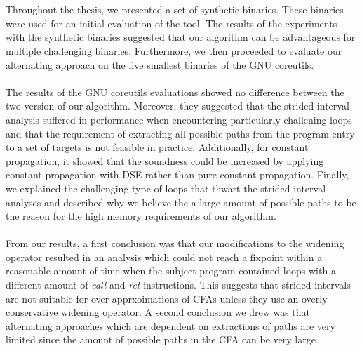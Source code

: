 \documentclass{kththesis}
\renewcommand{\it}[1]{\textit{#1}}
\begin{document}
\\ \\
Throughout the thesis, we presented a set of synthetic binaries. These binaries were used for an initial evaluation of the tool. The results of the experiments with the synthetic binaries suggested that our algorithm can be advantageous for multiple challenging binaries. Furthermore, we then proceeded to evaluate our alternating approach on the five smallest binaries of the GNU coreutils. 
\\ \\
The results of the GNU coreutils evaluations showed no difference between the two version of our algorithm. Moreover, they suggested that the strided interval analysis suffered in performance when encountering particularly challening loops and that the requirement of extracting all possible paths from the program entry to a set of targets is not feasible in practice. Additionally, for constant propagation, it showed that the soundness could be increased by applying constant propagation with DSE rather than pure constant propagation. Finally, we explained the challenging type of loops that thwart the strided interval analyses and described why we believe the a large amount of possible paths to be the reason for the high memory requirements of our algorithm.
\\ \\
From our results, a first conclusion was that our modifications to the widening operator resulted in an analysis which could not reach a fixpoint within a reasonable amount of time when the subject program contained loops with a different amount of \it{call} and \it{ret} instructions. This suggests that strided intervals are not suitable for over-apprxoimations of CFAs unless they use an overly conservative widening operator. A second conclusion we drew was that alternating approaches which are dependent on extractions of paths are very limited since the amount of possible paths in the CFA can be very large.

\end{document}
